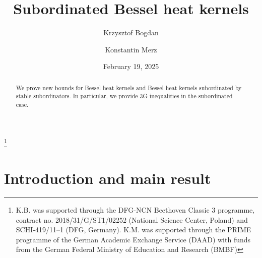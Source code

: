 \documentclass[12pt,reqno,a4paper]{amsart}
\newcommand\version{February 19, 2025}
\theoremstyle{definition}
\theoremstyle{remark}
\numberwithin{equation}{section}
\newcommand{\1}{\mathbbm{1}}
\begin{document}
\title[Subordinated Bessel heat kernels --- \version]{Subordinated Bessel heat kernels}


\author[K. Bogdan]{Krzysztof Bogdan}
\address[Krzysztof Bogdan]{Department of Pure and Applied Mathematics, Wroc\l aw University of Science and Technology, Hoene-Wro\'nskiego 13C, 50-376 Wroc\l aw, Poland}



\author[K. Merz]{Konstantin Merz}
\address[Konstantin Merz]{Institut f\"ur Analysis und Algebra, Technische Universit\"at Braunschweig, Universit\"atsplatz 2, 38106 Braun\-schweig, Germany, and Department of Mathematics, Graduate School of Science, Osaka University, Toyonaka, Osaka 560-0043, Japan}

\thanks{K.B. was supported through the DFG-NCN Beethoven Classic 3 programme, contract no. 2018/31/G/ST1/02252 (National Science Center, Poland) and SCHI-419/11–1 (DFG, Germany).
  K.M. was supported through the PRIME programme of the German Academic Exchange Service (DAAD) with funds from the German Federal Ministry of Education and Research (BMBF)}


\date{\version}


\begin{abstract}
    We prove new bounds for Bessel heat kernels and Bessel heat kernels subordinated by stable subordinators. In particular, we provide 3G inequalities in the subordinated case.
\end{abstract}


\maketitle


\section{Introduction and main result}

\label{s:semigroupproperties}
\end{document}
